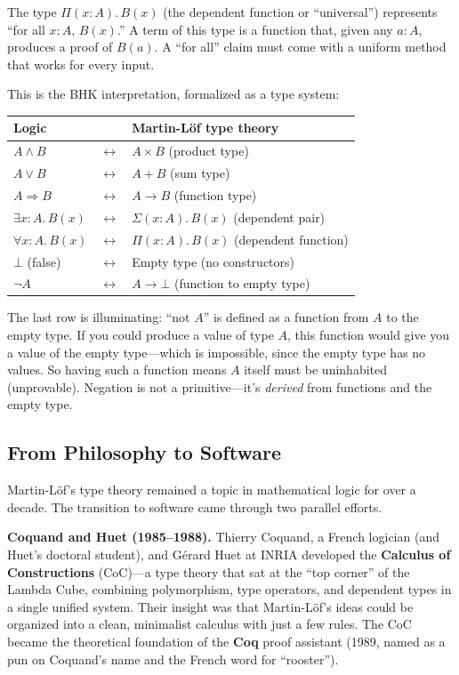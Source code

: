 \documentclass[11pt,a4paper]{article}
\theoremstyle{definition}
\begin{document}
The type $\Pi(x{:}A).\, B(x)$ (the dependent function or ``universal'')
represents ``for all $x : A$, $B(x)$.'' A term of this type is a function
that, given any $a : A$, produces a proof of $B(a)$. A ``for all'' claim must
come with a uniform method that works for every input.

This is the BHK interpretation, formalized as a type system:

\begin{center}
\renewcommand{\arraystretch}{1.4}
\begin{tabular}{lcl}
\textbf{Logic} & & \textbf{Martin-L\"of type theory} \\
\hline
$A \land B$ & $\longleftrightarrow$ & $A \times B$ (product type) \\
$A \lor B$ & $\longleftrightarrow$ & $A + B$ (sum type) \\
$A \Rightarrow B$ & $\longleftrightarrow$ & $A \to B$ (function type) \\
$\exists x{:}A.\, B(x)$ & $\longleftrightarrow$ & $\Sigma(x{:}A).\, B(x)$ (dependent pair) \\
$\forall x{:}A.\, B(x)$ & $\longleftrightarrow$ & $\Pi(x{:}A).\, B(x)$ (dependent function) \\
$\bot$ (false) & $\longleftrightarrow$ & Empty type (no constructors) \\
$\lnot A$ & $\longleftrightarrow$ & $A \to \bot$ (function to empty type) \\
\end{tabular}
\end{center}

The last row is illuminating: ``not $A$'' is defined as a function from $A$ to
the empty type. If you could produce a value of type $A$, this function would
give you a value of the empty type---which is impossible, since the empty type
has no values. So having such a function means $A$ itself must be uninhabited
(unprovable). Negation is not a primitive---it's \emph{derived} from functions
and the empty type.

\subsection{From Philosophy to Software}

Martin-L\"of's type theory remained a topic in mathematical logic for over a
decade. The transition to software came through two parallel efforts.

\textbf{Coquand and Huet (1985--1988).} Thierry Coquand, a French logician
(and Huet's doctoral student), and G\'erard Huet at INRIA developed the
\textbf{Calculus of Constructions} (CoC)---a type theory that sat at the
``top corner'' of the Lambda Cube, combining polymorphism, type operators, and
dependent types in a single unified system. Their insight was that
Martin-L\"of's ideas could be organized into a clean, minimalist calculus with
just a few rules. The CoC became the theoretical foundation of the \textbf{Coq}
proof assistant (1989, named as a pun on Coquand's name and the French word
for ``rooster'').
\end{document}
